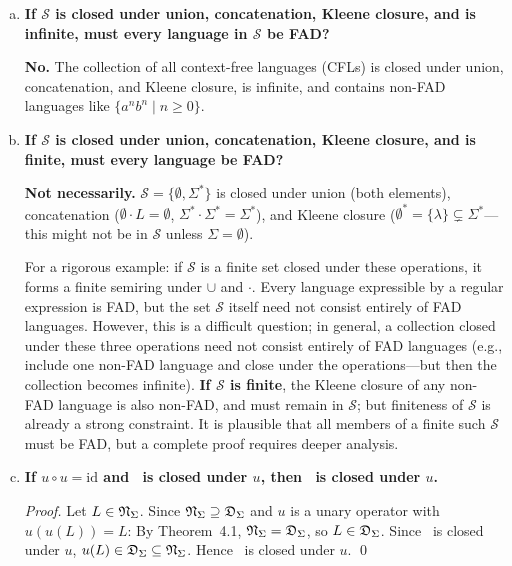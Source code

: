 \begin{enumerate}[{5.}1. ]
\begin{enumerate}[(a)]
\begin{enumerate}[(a)]
  \item \textbf{Proof.}  If $w\in(\Sigma_1\cup\Sigma_2)^*$ and $w$ contains any letter from $\Sigma_2\setminus\Sigma_1$, then $A'$ goes to $d$ and stays there, rejecting $w$.  If $w\in\Sigma_1^*$, then $A'$ behaves identically to $A$.  Hence $L(A')=L(A)$ (viewed as a subset of $(\Sigma_1\cup\Sigma_2)^*$). \qed
\end{enumerate}

\item \textbf{If $\mathcal{S}$ is closed under union, concatenation, Kleene closure, and is infinite, must every language in $\mathcal{S}$ be FAD?}

\textbf{No.}  The collection of all context-free languages (CFLs) is closed under union, concatenation, and Kleene closure, is infinite, and contains non-FAD languages like $\{a^nb^n\mid n\ge 0\}$.

\item \textbf{If $\mathcal{S}$ is closed under union, concatenation, Kleene closure, and is finite, must every language be FAD?}

\textbf{Not necessarily.}  $\mathcal{S}=\{\emptyset,\Sigma^*\}$ is closed under union (both elements), concatenation ($\emptyset\cdot L=\emptyset$, $\Sigma^*\cdot\Sigma^*=\Sigma^*$), and Kleene closure ($\emptyset^*=\{\lambda\}\subsetneq\Sigma^*$---this might not be in $\mathcal{S}$ unless $\Sigma=\emptyset$).

For a rigorous example: if $\mathcal{S}$ is a finite set closed under these operations, it forms a finite semiring under $\cup$ and $\cdot$.  Every language expressible by a regular expression is FAD, but the set $\mathcal{S}$ itself need not consist entirely of FAD languages.  However, this is a difficult question; in general, a collection closed under these three operations need not consist entirely of FAD languages (e.g., include one non-FAD language and close under the operations---but then the collection becomes infinite).  \textbf{If $\mathcal{S}$ is finite}, the Kleene closure of any non-FAD language is also non-FAD, and must remain in $\mathcal{S}$; but finiteness of $\mathcal{S}$ is already a strong constraint.  It is plausible that all members of a finite such $\mathcal{S}$ must be FAD, but a complete proof requires deeper analysis.

\item \textbf{If $u\circ u=\text{id}$ and \DSIG\ is closed under $u$, then \NSIG\ is closed under $u$.}

\begin{proof}
Let $L\in\mathfrak{N}_\Sigma$.  Since $\mathfrak{N}_\Sigma\supseteq\mathfrak{D}_\Sigma$ and $u$ is a unary operator with $u(u(L))=L$:
By Theorem~4.1, $\mathfrak{N}_\Sigma=\mathfrak{D}_\Sigma$, so $L\in\mathfrak{D}_\Sigma$.  Since \DSIG\ is closed under $u$, $u(L)\in\mathfrak{D}_\Sigma\subseteq\mathfrak{N}_\Sigma$.  Hence \NSIG\ is closed under $u$.  \qed


\end{proof}
\end{enumerate}
\end{enumerate}
